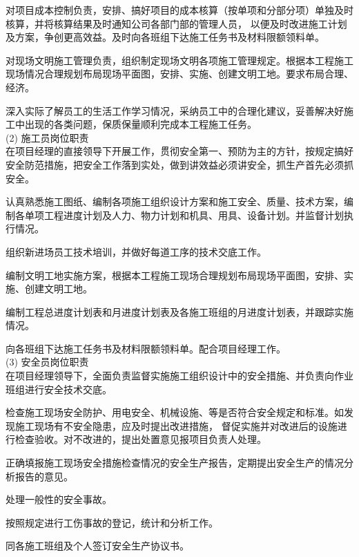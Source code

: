  对项目成本控制负责，安排、搞好项目的成本核算（按单项和分部分项）单独及时核算，并将核算结果及时通知公司各部门部的管理人员，
以便及时改进施工计划及方案，争创更高效益。及时向各班组下达施工任务书及材料限额领料单。

 对现场文明施工管理负责，组织制定现场文明各项施工管理规定。根据本工程施工现场情况合理规划布局现场平面图，安排、实施、创建文明工地。要求布局合理、经济。

 深入实际了解员工的生活工作学习情况，采纳员工中的合理化建议，妥善解决好施工中出现的各类问题，保质保量顺利完成本工程施工任务。\\

(2) 施工员岗位职责\\

 在项目经理的直接领导下开展工作，贯彻安全第一、预防为主的方针，按规定搞好安全防范措施，把安全工作落到实处，做到讲效益必须讲安全，抓生产首先必须抓安全。

 认真熟悉施工图纸、编制各项施工组织设计方案和施工安全、质量、技术方案，编制各单项工程进度计划及人力、物力计划和机具、用具、设备计划。并监督计划执行情况。

 组织新进场员工技术培训，并做好每道工序的技术交底工作。

 编制文明工地实施方案，根据本工程施工现场合理规划布局现场平面图，安排、实施、创建文明工地。

 编制工程总进度计划表和月进度计划表及各施工班组的月进度计划表，并跟踪实施情况。

 向各班组下达施工任务书及材料限额领料单。配合项目经理工作。\\

(3) 安全员岗位职责\\

 在项目经理领导下，全面负责监督实施施工组织设计中的安全措施、并负责向作业班组进行安全技术交底。

 检查施工现场安全防护、用电安全、机械设施、等是否符合安全规定和标准。如发现施工现场有不安全隐患，应及时提出改进措施，
督促实施并对改进后的设施进行检查验收。对不改进的，提出处置意见报项目负责人处理。

 正确填报施工现场安全措施检查情况的安全生产报告，定期提出安全生产的情况分析报告的意见。

 处理一般性的安全事故。

 按照规定进行工伤事故的登记，统计和分析工作。

 同各施工班组及个人签订安全生产协议书。

